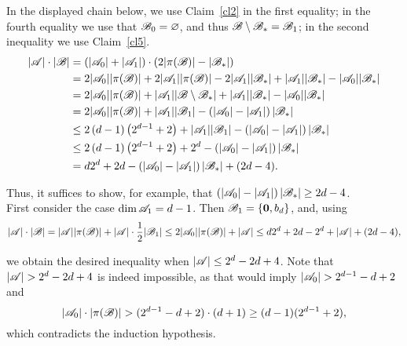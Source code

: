         In the displayed chain below, we use Claim~\ref{cl2} in the first equality; in the fourth equality we use that ${\mathscr{B}}_0 = \varnothing$, and thus ${\mathscr{B}}\setminus {\mathscr{B}}_*={\mathscr{B}}_1$; in the second inequality we use  Claim~\ref{cl5}.
        \begin{align}
            |{\mathscr{A}}|\cdot|{\mathscr{B}}|& = (|{\mathscr{A}}_0|+|{\mathscr{A}}_1|)\cdot(2|\pi({\mathscr{B}})|-|{\mathscr{B}}_*|)\nonumber\\
            & = 2|{\mathscr{A}}_0||\pi({\mathscr{B}})| + 2|{\mathscr{A}}_1||\pi({\mathscr{B}})|- 2|{\mathscr{A}}_1||{\mathscr{B}}_*| + |{\mathscr{A}}_1||{\mathscr{B}}_*| - |{\mathscr{A}}_0||{\mathscr{B}}_*|  \nonumber\\
            & = 2|{\mathscr{A}}_0||\pi({\mathscr{B}})|  + |{\mathscr{A}}_1||{\mathscr{B}} \setminus {\mathscr{B}}_*| + |{\mathscr{A}}_1||{\mathscr{B}}_*|- |{\mathscr{A}}_0||{\mathscr{B}}_*| \nonumber\\
            & = 2|{\mathscr{A}}_0||\pi({\mathscr{B}})|+|{\mathscr{A}}_1||{\mathscr{B}}_1|-\left(|{\mathscr{A}}_0|-|{\mathscr{A}}_1|\right)|{\mathscr{B}}_*| \label{general} \\
            & \leq 2\left(d-1\right)\left(2^{d-1}+2\right)+|{\mathscr{A}}_1||{\mathscr{B}}_1|-\left(|{\mathscr{A}}_0|-|{\mathscr{A}}_1|\right)|{\mathscr{B}}_*| \label{general_ind} \\
            & \leq 2\left(d-1\right)\left(2^{d-1}+2\right)+2^{d}-\left(|{\mathscr{A}}_0|-|{\mathscr{A}}_1|\right)|{\mathscr{B}}_*| \nonumber \\
            & = d 2^{d} + 2d - \left(|{\mathscr{A}}_0|-|{\mathscr{A}}_1|\right)|{\mathscr{B}}_*| + (2d-4). \label{2d_minus_4}
        \end{align}
        
        \noindent Thus, it suffices to show, for example, that 
        $\left(\left|{\mathscr{A}}_0\right|-\left|{\mathscr{A}}_1\right|\right)\left|{\mathscr{B}}_*\right|\geq 2d-4$. \\
        \noindent First consider the case  $\operatorname{dim}{\mathscr{A}}_1=d-1$. Then ${\mathscr{B}}_1=\{\mathbf{0}, b_d\}$, and, using 
        \begin{equation*}
            |{\mathscr{A}}|\cdot|{\mathscr{B}}|=|{\mathscr{A}}||\pi({\mathscr{B}})|+|{\mathscr{A}}|\cdot\frac{1}{2}|{\mathscr{B}}_1|\leq 2|{\mathscr{A}}_0||\pi({\mathscr{B}})| + |{\mathscr{A}}| \leq d 2^d + 2d - 2^d + \left|{\mathscr{A}}\right|+(2d-4),
        \end{equation*}
    
        we obtain the desired inequality when $\left|{\mathscr{A}}\right|\leq 2^d-2d+4 $. Note that $\left|\aaa\right|> 2^d-2d+4$ is indeed impossible, as that would imply $\left|\aaa_0\right|> 2^{d-1}-d+2$ and
        \begin{equation*}
            \left|{\mathscr{A}}_0\right|\cdot\left|\pi({\mathscr{B}})\right| > (2^{d-1}-d+2)\cdot(d+1)\geq(d-1)(2^{d-1}+2),
        \end{equation*}
        which contradicts the induction hypothesis. 
        
